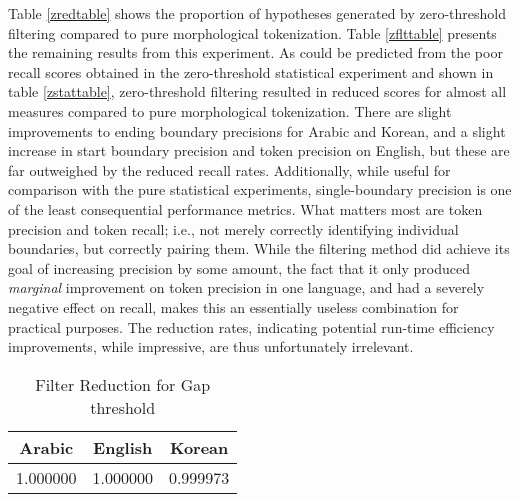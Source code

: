 Table \ref{zredtable} shows the proportion of hypotheses generated by zero-threshold filtering compared to pure morphological tokenization. Table \ref{zflttable} presents the remaining results from this experiment. As could be predicted from the poor recall scores obtained in the zero-threshold statistical experiment and shown in table \ref{zstattable}, zero-threshold filtering resulted in reduced scores for almost all measures compared to pure morphological tokenization. There are slight improvements to ending boundary precisions for Arabic and Korean, and a slight increase in start boundary precision and token precision on English, but these are far outweighed by the reduced recall rates. Additionally, while useful for comparison with the pure statistical experiments, single-boundary precision is one of the least consequential performance metrics. What matters most are token precision and token recall; i.e., not merely correctly identifying individual boundaries, but correctly pairing them. While the filtering method did achieve its goal of increasing precision by some amount, the fact that it only produced \textit{marginal} improvement on token precision in one language, and had a severely negative effect on recall, makes this an essentially useless combination for practical purposes. The reduction rates, indicating potential run-time efficiency improvements, while impressive, are thus unfortunately irrelevant.

\begin{table}
	\centering	
	\begin{tabular}{| c | c | c |}
		\hline
		Arabic & English & Korean \\ \hline
		1.000000 & 1.000000 & 0.999973 \\ \hline
	\end{tabular}
	\caption{Filter Reduction for Gap threshold}
	\label{gredtable}
\end{table}

